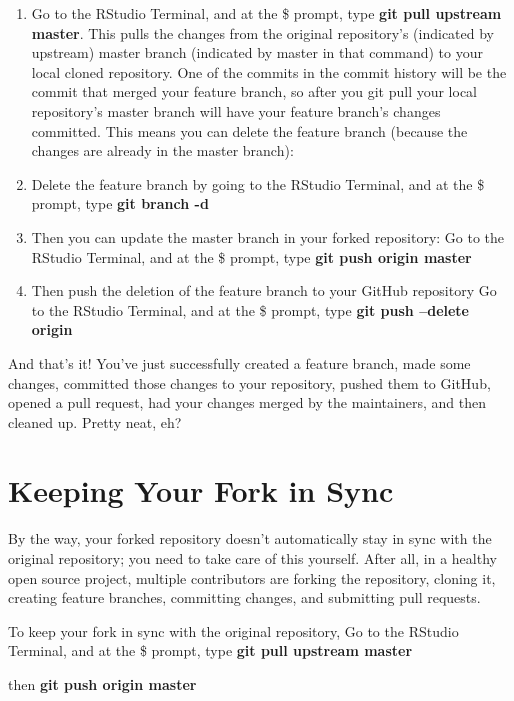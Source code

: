 \documentclass[
]{book}
\begin{document}
\begin{enumerate}
\def\labelenumi{\arabic{enumi}.}
\item
  Go to the RStudio Terminal, and at the \$ prompt, type
  \textbf{git pull upstream master}.
  This pulls the changes from the original repository's (indicated by upstream) master branch (indicated by master in that command) to your local cloned repository. One of the commits in the commit history will be the commit that merged your feature branch, so after you git pull your local repository's master branch will have your feature branch's changes committed. This means you can delete the feature branch (because the changes are already in the master branch):
\item
  Delete the feature branch by going to the RStudio Terminal, and at the \$ prompt, type
  \textbf{git branch -d }
\item
  Then you can update the master branch in your forked repository:
  Go to the RStudio Terminal, and at the \$ prompt, type
  \textbf{git push origin master}
\item
  Then push the deletion of the feature branch to your GitHub repository
  Go to the RStudio Terminal, and at the \$ prompt, type
  \textbf{git push --delete origin }
\end{enumerate}

And that's it! You've just successfully created a feature branch, made some changes, committed those changes to your repository, pushed them to GitHub, opened a pull request, had your changes merged by the maintainers, and then cleaned up. Pretty neat, eh?

\hypertarget{keeping-your-fork-in-sync}{%
\section{Keeping Your Fork in Sync}\label{keeping-your-fork-in-sync}}

By the way, your forked repository doesn't automatically stay in sync with the original repository; you need to take care of this yourself. After all, in a healthy open source project, multiple contributors are forking the repository, cloning it, creating feature branches, committing changes, and submitting pull requests.

To keep your fork in sync with the original repository,
Go to the RStudio Terminal, and at the \$ prompt, type
\textbf{git pull upstream master}

then
\textbf{git push origin master}
\end{document}
